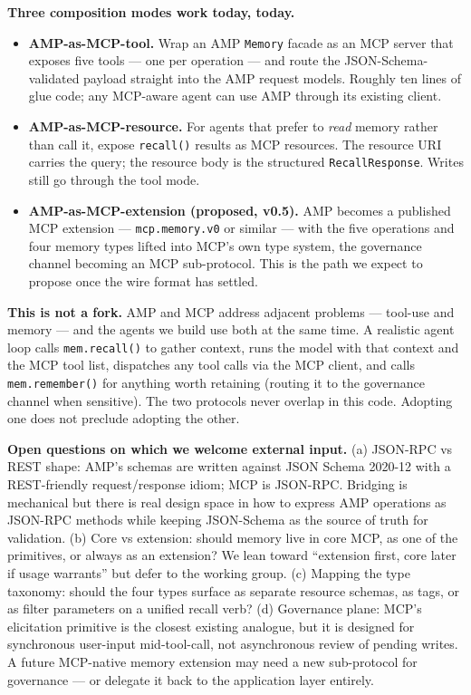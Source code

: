 \documentclass[11pt,letterpaper,twocolumn]{article}
\begin{document}
\textbf{Three composition modes work today, today.}

\begin{itemize}[leftmargin=*]
  \item \textbf{AMP-as-MCP-tool.} Wrap an AMP \texttt{Memory} facade as an MCP server that exposes five tools --- one per operation --- and route the JSON-Schema-validated payload straight into the AMP request models. Roughly ten lines of glue code; any MCP-aware agent can use AMP through its existing client.
  \item \textbf{AMP-as-MCP-resource.} For agents that prefer to \emph{read} memory rather than call it, expose \texttt{recall()} results as MCP resources. The resource URI carries the query; the resource body is the structured \texttt{RecallResponse}. Writes still go through the tool mode.
  \item \textbf{AMP-as-MCP-extension (proposed, v0.5).} AMP becomes a published MCP extension --- \texttt{mcp.memory.v0} or similar --- with the five operations and four memory types lifted into MCP's own type system, the governance channel becoming an MCP sub-protocol. This is the path we expect to propose once the wire format has settled.
\end{itemize}

\textbf{This is not a fork.} AMP and MCP address adjacent problems --- tool-use and memory --- and the agents we build use both at the same time. A realistic agent loop calls \texttt{mem.recall()} to gather context, runs the model with that context and the MCP tool list, dispatches any tool calls via the MCP client, and calls \texttt{mem.remember()} for anything worth retaining (routing it to the governance channel when sensitive). The two protocols never overlap in this code. Adopting one does not preclude adopting the other.

\textbf{Open questions on which we welcome external input.} (a) JSON-RPC vs REST shape: AMP's schemas are written against JSON Schema 2020-12 with a REST-friendly request/response idiom; MCP is JSON-RPC. Bridging is mechanical but there is real design space in how to express AMP operations as JSON-RPC methods while keeping JSON-Schema as the source of truth for validation. (b) Core vs extension: should memory live in core MCP, as one of the primitives, or always as an extension? We lean toward ``extension first, core later if usage warrants'' but defer to the working group. (c) Mapping the type taxonomy: should the four types surface as separate resource schemas, as tags, or as filter parameters on a unified recall verb? (d) Governance plane: MCP's elicitation primitive is the closest existing analogue, but it is designed for synchronous user-input mid-tool-call, not asynchronous review of pending writes. A future MCP-native memory extension may need a new sub-protocol for governance --- or delegate it back to the application layer entirely.
\end{document}
